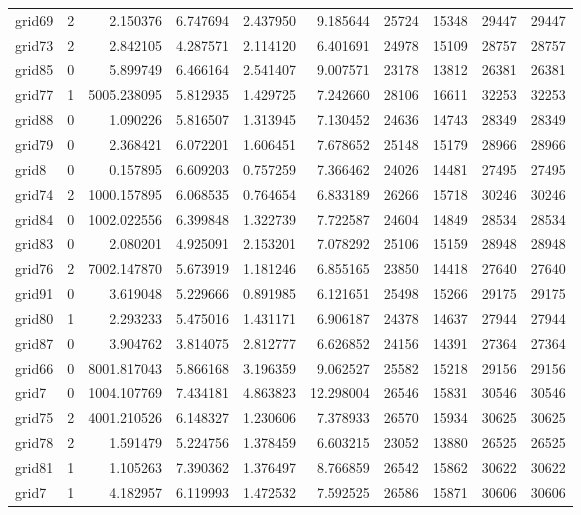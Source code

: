 \begin{longtable}{|l|r|r|r|r|r|r|r|r|r|}
grid69 & 2 & 2.150376 & 6.747694 & 2.437950 & 9.185644 & 25724 & 15348 & 29447 & 29447 \\
grid73 & 2 & 2.842105 & 4.287571 & 2.114120 & 6.401691 & 24978 & 15109 & 28757 & 28757 \\
grid85 & 0 & 5.899749 & 6.466164 & 2.541407 & 9.007571 & 23178 & 13812 & 26381 & 26381 \\
grid77 & 1 & 5005.238095 & 5.812935 & 1.429725 & 7.242660 & 28106 & 16611 & 32253 & 32253 \\
grid88 & 0 & 1.090226 & 5.816507 & 1.313945 & 7.130452 & 24636 & 14743 & 28349 & 28349 \\
grid79 & 0 & 2.368421 & 6.072201 & 1.606451 & 7.678652 & 25148 & 15179 & 28966 & 28966 \\
grid8 & 0 & 0.157895 & 6.609203 & 0.757259 & 7.366462 & 24026 & 14481 & 27495 & 27495 \\
grid74 & 2 & 1000.157895 & 6.068535 & 0.764654 & 6.833189 & 26266 & 15718 & 30246 & 30246 \\
grid84 & 0 & 1002.022556 & 6.399848 & 1.322739 & 7.722587 & 24604 & 14849 & 28534 & 28534 \\
grid83 & 0 & 2.080201 & 4.925091 & 2.153201 & 7.078292 & 25106 & 15159 & 28948 & 28948 \\
grid76 & 2 & 7002.147870 & 5.673919 & 1.181246 & 6.855165 & 23850 & 14418 & 27640 & 27640 \\
grid91 & 0 & 3.619048 & 5.229666 & 0.891985 & 6.121651 & 25498 & 15266 & 29175 & 29175 \\
grid80 & 1 & 2.293233 & 5.475016 & 1.431171 & 6.906187 & 24378 & 14637 & 27944 & 27944 \\
grid87 & 0 & 3.904762 & 3.814075 & 2.812777 & 6.626852 & 24156 & 14391 & 27364 & 27364 \\
grid66 & 0 & 8001.817043 & 5.866168 & 3.196359 & 9.062527 & 25582 & 15218 & 29156 & 29156 \\
grid7 & 0 & 1004.107769 & 7.434181 & 4.863823 & 12.298004 & 26546 & 15831 & 30546 & 30546 \\
grid75 & 2 & 4001.210526 & 6.148327 & 1.230606 & 7.378933 & 26570 & 15934 & 30625 & 30625 \\
grid78 & 2 & 1.591479 & 5.224756 & 1.378459 & 6.603215 & 23052 & 13880 & 26525 & 26525 \\
grid81 & 1 & 1.105263 & 7.390362 & 1.376497 & 8.766859 & 26542 & 15862 & 30622 & 30622 \\
grid7 & 1 & 4.182957 & 6.119993 & 1.472532 & 7.592525 & 26586 & 15871 & 30606 & 30606 \\

\end{longtable}
